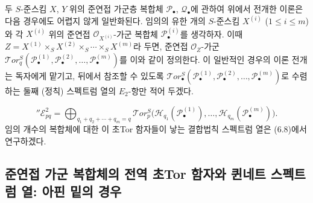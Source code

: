 \begin{env}[6.5.15]
\label{III.6.5.15-fr}
두 $S$-준스킴 $X$, $Y$ 위의 준연접 가군층 복합체
$\mathscr P_\bullet$, $\mathscr Q_\bullet$에 관하여 위에서 전개한
이론은 다음 경우에도 어렵지 않게 일반화된다. 임의의 유한 개의
$S$-준스킴 $X^{(i)}$ ($1\leqslant i\leqslant m$)와 각 $X^{(i)}$ 위의
준연접 $\mathscr O_{X^{(i)}}$-가군 복합체
$\mathscr P_\bullet^{(i)}$를 생각하자. 이때
$Z=X^{(1)}\times_S X^{(2)}\times_S\cdots\times_S X^{(m)}$라 두면,
준연접 $\mathscr O_Z$-가군
$\mathscr{T}\!or_q^S(\mathscr P_\bullet^{(1)},\mathscr P_\bullet^{(2)},
\ldots,\mathscr P_\bullet^{(m)})$를 이와 같이 정의한다. 이 일반적인
경우의 이론 전개는 독자에게 맡기고, 뒤에서 참조할 수 있도록
$\mathscr{T}\!or_\bullet^S(\mathscr P_\bullet^{(1)},
\mathscr P_\bullet^{(2)},\ldots,\mathscr P_\bullet^{(m)})$로 수렴하는
둘째 (정칙) 스펙트럼 열의 $E_2$-항만 적어 두겠다.


\[
  ''\mathscr E_{pq}^2
  =\bigoplus_{q_1+q_2+\cdots+q_m=q}
   \mathscr{T}\!or_p^S
   \bigl(\mathscr H_{q_1}(\mathscr P_\bullet^{(1)}),\ldots,
         \mathscr H_{q_m}(\mathscr P_\bullet^{(m)})\bigr).
  \tag{6.5.15.1}\label{III.6.5.15.1.fr}
\]
임의 개수의 복합체에 대한 이 초Tor 함자들이 낳는 결합법칙 스펙트럼
열은 (6.8)에서 연구하겠다.
\end{env}

\subsection{준연접 가군 복합체의 전역 초Tor 함자와 퀸네트 스펙트럼 열:
아핀 밑의 경우}
\label{subsection:III.6.6.fr}

